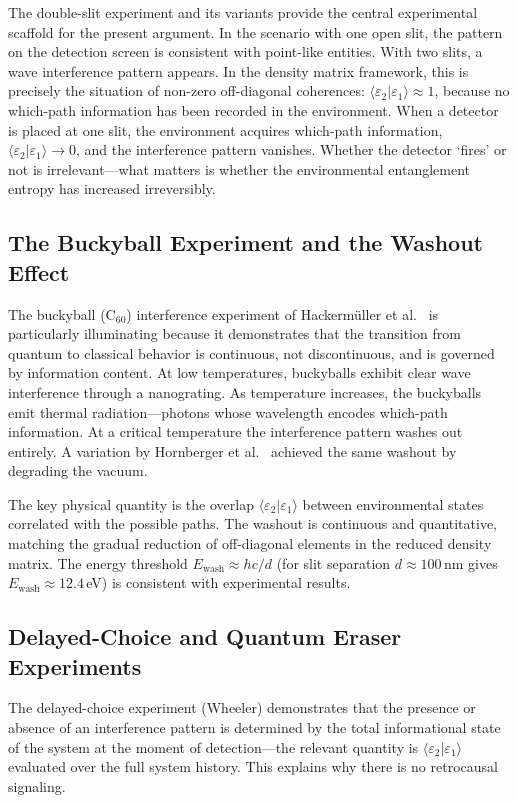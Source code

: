 \documentclass[11pt,a4paper]{article}
\theoremstyle{plain}
\theoremstyle{definition}
\theoremstyle{remark}
\newcommand{\braket}[2]{\langle #1 | #2 \rangle}
\begin{document}
The double-slit experiment and its variants provide the central experimental
scaffold for the present argument. In the scenario with one open slit, the pattern
on the detection screen is consistent with point-like entities. With two slits, a
wave interference pattern appears. In the density matrix framework, this is
precisely the situation of non-zero off-diagonal coherences:
$\braket{\varepsilon_2}{\varepsilon_1} \approx 1$, because no which-path
information has been recorded in the environment. When a detector is placed at one
slit, the environment acquires which-path information,
$\braket{\varepsilon_2}{\varepsilon_1} \to 0$, and the interference pattern
vanishes. Whether the detector `fires' or not is irrelevant---what matters is
whether the environmental entanglement entropy has increased irreversibly.

\subsection{The Buckyball Experiment and the Washout Effect}

The buckyball (C$_{60}$) interference experiment of Hackerm\"{u}ller et
al.~\citep{Hackermuller2004} is particularly illuminating because it demonstrates
that the transition from quantum to classical behavior is continuous, not
discontinuous, and is governed by information content. At low temperatures,
buckyballs exhibit clear wave interference through a nanograting. As temperature
increases, the buckyballs emit thermal radiation---photons whose wavelength encodes
which-path information. At a critical temperature the interference pattern washes
out entirely. A variation by Hornberger et al.~\citep{Hornberger2003} achieved the
same washout by degrading the vacuum.

The key physical quantity is the overlap $\braket{\varepsilon_2}{\varepsilon_1}$
between environmental states correlated with the possible paths. The washout is
continuous and quantitative, matching the gradual reduction of off-diagonal
elements in the reduced density matrix. The energy threshold $E_{\mathrm{wash}}
\approx hc/d$ (for slit separation $d \approx 100$\,nm gives $E_{\mathrm{wash}}
\approx 12.4$\,eV) is consistent with experimental results.

\subsection{Delayed-Choice and Quantum Eraser Experiments}

The delayed-choice experiment (Wheeler) demonstrates that the presence or absence
of an interference pattern is determined by the total informational state of the
system at the moment of detection---the relevant quantity is
$\braket{\varepsilon_2}{\varepsilon_1}$ evaluated over the full system history.
This explains why there is no retrocausal signaling.
\end{document}
